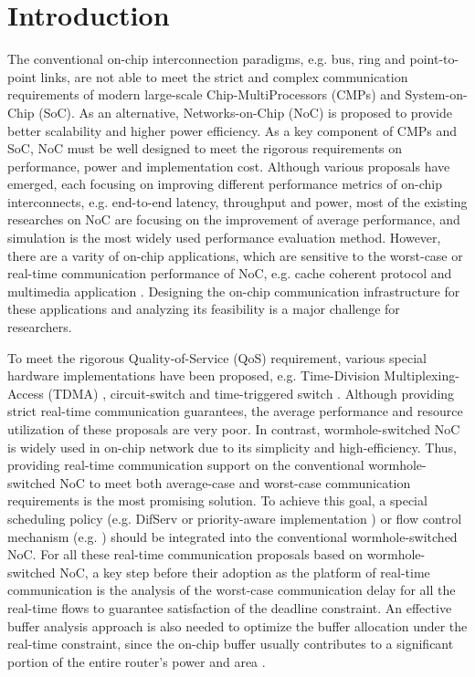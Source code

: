 \documentclass[10pt,journal]{IEEEtran}
\begin{document}
\section{Introduction}
The conventional on-chip interconnection paradigms, e.g. bus, ring and point-to-point links, are not able to meet the strict and complex communication requirements of modern large-scale Chip-MultiProcessors (CMPs) and System-on-Chip (SoC). As an alternative, Networks-on-Chip (NoC) is proposed to provide better scalability and higher power efficiency. As a key component of CMPs and SoC, NoC must be well designed to meet the rigorous requirements on performance, power and implementation cost. Although various proposals have emerged, each focusing on improving different performance metrics of on-chip interconnects, e.g. end-to-end latency, throughput and power, most of the existing researches on NoC are focusing on the improvement of average performance, and simulation is the most widely used performance evaluation method. However, there are a varity of on-chip applications, which are sensitive to the worst-case or real-time communication performance of NoC, e.g. cache coherent protocol \cite{Bolotin2007} and multimedia application \cite{ostermann2004video}. Designing the on-chip communication infrastructure for these applications and analyzing its feasibility is a major challenge for researchers.

To meet the rigorous Quality-of-Service (QoS) requirement, various special hardware implementations have been proposed, e.g. Time-Division Multiplexing-Access (TDMA) \cite{GoDR05}, circuit-switch \cite{6628254} and time-triggered switch \cite{4617280}. Although providing strict real-time communication guarantees, the average performance and resource utilization of these proposals are very poor. In contrast, wormhole-switched NoC is widely used in on-chip network due to its simplicity and high-efficiency. Thus, providing real-time communication support on the conventional wormhole-switched NoC to meet both average-case and worst-case communication requirements is the most promising solution. To achieve this goal, a special scheduling policy (e.g. DifServ \cite{1411140} or priority-aware implementation \cite{Shi:2008:RCA:1397757.1397996}\cite{708526}\cite{627905}) or flow control mechanism (e.g. \cite{Li199649}\cite{707545}) should be integrated into the conventional wormhole-switched NoC. For all these real-time communication proposals based on wormhole-switched NoC, a key step before their adoption as the platform of real-time communication is the analysis of the worst-case communication delay for all the real-time flows to guarantee satisfaction of the deadline constraint. An effective buffer analysis approach is also needed to optimize the buffer allocation under the real-time constraint, since the on-chip buffer usually contributes to a significant portion of the entire router's power and area \cite{pkundu}\cite{5507566}.
\end{document}
